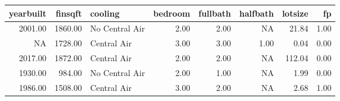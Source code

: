 \begin{table}[ht]
\centering
\begin{tabular}{rrlrrrrr}
  \hline
yearbuilt & finsqft & cooling & bedroom & fullbath & halfbath & lotsize & fp \\ 
  \hline
2001.00 & 1860.00 & No Central Air & 2.00 & 2.00 & NA & 21.84 & 1.00 \\ 
  NA & 1728.00 & Central Air & 3.00 & 3.00 & 1.00 & 0.04 & 0.00 \\ 
  2017.00 & 1872.00 & Central Air & 2.00 & 2.00 & NA & 112.04 & 0.00 \\ 
  1930.00 & 984.00 & No Central Air & 2.00 & 1.00 & NA & 1.99 & 0.00 \\ 
  1986.00 & 1508.00 & Central Air & 3.00 & 2.00 & NA & 2.68 & 1.00 \\ 
   \hline
\end{tabular}
\end{table}
